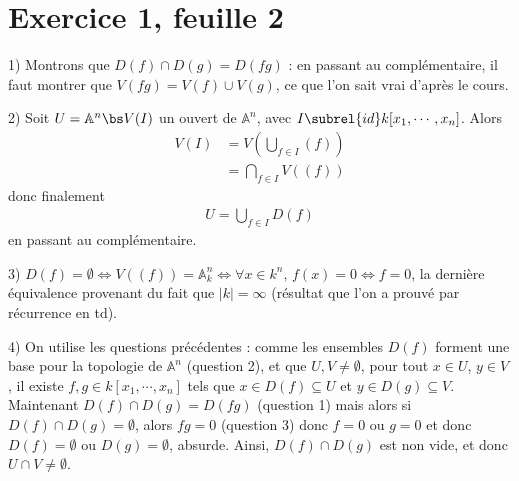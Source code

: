 \documentclass[11pt]{article}
\begin{document}
\section*{Exercice 1, feuille 2}
    \begin{question}{1)}
        Montrons que $D(f) \cap D(g) = D(fg)$ : en passant au complémentaire, il faut montrer que $V(fg) = V(f) \cup V(g)$, ce que l'on sait vrai d'après le cours.
    \end{question}
    \begin{question}{2)}
        Soit $U = \mathbb{A}^n \bs V(I)$ un ouvert de $\mathbb{A}^n$, avec $I \subrel{id} k[x_1, \cdots, x_n]$. Alors
        \begin{align*}
            V(I) &= V\left( \bigcup_{f \in I} (f) \right) \\
            &= \bigcap_{f \in I} V((f))
        \end{align*}
        donc finalement
        \begin{align*}
            U = \bigcup_{f \in I} D(f)
        \end{align*}
        en passant au complémentaire.
    \end{question}
    \begin{question}{3)}
        $D(f) = \emptyset \iff V((f)) = \mathbb{A}^n_k \iff \forall x \in k^n,\, f(x) = 0 \iff f = 0$, la dernière équivalence provenant du fait que $|k| = \infty$ (résultat que l'on a prouvé par récurrence en td).
    \end{question}
    \begin{question}{4)}
        On utilise les questions précédentes : comme les ensembles $D(f)$ forment une base pour la topologie de $\mathbb{A}^n$ (question 2), et que $U,V \neq \emptyset$, pour tout $x \in U$, $y \in V$, il existe $f,g \in k[x_1, \cdots, x_n]$ tels que $x \in D(f) \subseteq U$ et $y \in D(g) \subseteq V$. Maintenant $D(f) \cap D(g) = D(fg)$ (question 1) mais alors si $D(f) \cap D(g) = \emptyset$, alors $fg = 0$ (question 3) donc $f = 0$ ou $g = 0$ et donc $D(f) = \emptyset$ ou $D(g) = \emptyset$, absurde. Ainsi, $D(f) \cap D(g)$ est non vide, et donc $U \cap V \neq \emptyset$.
    \end{question}
\end{document}
